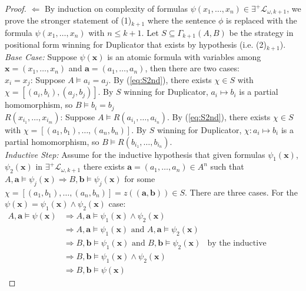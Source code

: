 \begin{prop}
\begin{proof}
$\Leftarrow$ By induction on complexity of formulas $\psi(x_{1},\dots,x_{n}) \in \exists^{+}\mathcal{L}_{\omega,k+1}$, we prove the stronger statement of (1)$_{k+1}$ where the sentence $\phi$ is replaced with the formula $\psi(x_{1},\dots,x_{n})$ with $n \leq k+1$. Let $S \subseteq \Gamma_{k+1}(A,B)$ be the strategy in positional form winning for Duplicator that exists by hypothesis (i.e. (2)$_{k+1}$). \\
\textit{Base Case:} Suppose $\psi(\mathbf{x})$ is an atomic formula with variables among $\mathbf{x} = (x_{1},\dots,x_{n})$ and $\mathbf{a} = (a_{1},\dots,a_{n})$, then there are two cases: \\
$x_{i} = x_{j}$: Suppose $A \vDash a_{i} = a_{j}$. By (\ref{eq:S2nd}), there exists $\chi \in S$ with $\chi = [(a_{i},b_{i}),(a_{j},b_{j})]$. By $S$ winning for Duplicator, $a_{i} \mapsto b_{i}$ is a partial homomorphism, so $B \vDash b_{i} = b_{j}$\\
$R(x_{i_{1}},\dots,x_{i_{m}})$: Suppose $A \vDash R(a_{i_{1}},\dots,a_{i_{n}})$. By (\ref{eq:S2nd}), there exists $\chi \in S$ with $\chi = [(a_{1},b_{1}),\dots,(a_{n},b_{n})]$. By $S$ winning for Duplicator, $\chi:a_{i} \mapsto b_{i}$ is a partial homomorphism, so $B \vDash R(b_{i_{1}},\dots,b_{i_{n}})$. \\
\textit{Inductive Step:} Assume for the inductive hypothesis that given formulas $\psi_{1}(\mathbf{x})$, $\psi_{2}(\mathbf{x})$ in $\exists^{+}\mathcal{L}_{\omega,k+1}$ there exists $\mathbf{a} = (a_{1},\dots,a_{n}) \in A^{n}$ such that $A,\mathbf{a} \vDash \psi_{j}(\mathbf{x}) \Rightarrow B,\mathbf{b} \vDash \psi_{j}(\mathbf{x})$ for some $\chi = [(a_{1},b_{1}),\dots,(a_{n},b_{n})] = z((\mathbf{a},\mathbf{b})) \in S$. There are three cases. For the $\psi(\mathbf{x}) = \psi_{1}(\mathbf{x}) \wedge \psi_{2}(\mathbf{x})$ case: 
\begin{align*}
A,\mathbf{a} \vDash \psi(\mathbf{x}) &\Rightarrow A,\mathbf{a} \vDash \psi_{1}(\mathbf{x}) \wedge \psi_{2}(\mathbf{x}) \\
&\Rightarrow A,\mathbf{a} \vDash \psi_{1}(\mathbf{x}) \text{ and } A,\mathbf{a} \vDash \psi_{2}(\mathbf{x}) \\
&\Rightarrow B,\mathbf{b} \vDash \psi_{1}(\mathbf{x}) \text{ and } B,\mathbf{b} \vDash \psi_{2}(\mathbf{x}) & \text{by the inductive hypothesis}\\
&\Rightarrow B,\mathbf{b} \vDash \psi_{1}(\mathbf{x}) \wedge \psi_{2}(\mathbf{x}) \\
&\Rightarrow B,\mathbf{b} \vDash \psi(\mathbf{x}) 
\end{align*}

\end{proof}
\end{prop}

